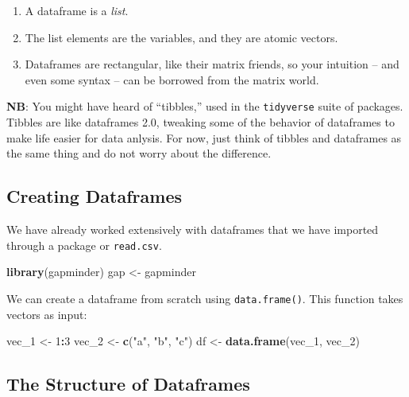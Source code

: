 \documentclass[
]{book}
\newenvironment{Shaded}{\begin{snugshade}}{\end{snugshade}}
\newcommand{\DecValTok}[1]{\textcolor[rgb]{0.00,0.00,0.81}{#1}}
\newcommand{\KeywordTok}[1]{\textcolor[rgb]{0.13,0.29,0.53}{\textbf{#1}}}
\newcommand{\NormalTok}[1]{#1}
\newcommand{\OperatorTok}[1]{\textcolor[rgb]{0.81,0.36,0.00}{\textbf{#1}}}
\newcommand{\StringTok}[1]{\textcolor[rgb]{0.31,0.60,0.02}{#1}}
\providecommand{\tightlist}{%
  \setlength{\itemsep}{0pt}\setlength{\parskip}{0pt}}
\begin{document}
\begin{enumerate}
\def\labelenumi{\arabic{enumi}.}
\tightlist
\item
  A dataframe is a \emph{list}.
\item
  The list elements are the variables, and they are atomic vectors.
\item
  Dataframes are rectangular, like their matrix friends, so your intuition -- and even some syntax -- can be borrowed from the matrix world.
\end{enumerate}

\textbf{NB}: You might have heard of ``tibbles,'' used in the \texttt{tidyverse} suite of packages. Tibbles are like dataframes 2.0, tweaking some of the behavior of dataframes to make life easier for data anlysis. For now, just think of tibbles and dataframes as the same thing and do not worry about the difference.

\hypertarget{creating-dataframes}{%
\subsection{Creating Dataframes}\label{creating-dataframes}}

We have already worked extensively with dataframes that we have imported through a package or \texttt{read.csv}.

\begin{Shaded}
\begin{Highlighting}[]
\KeywordTok{library}\NormalTok{(gapminder)}
\NormalTok{gap <-}\StringTok{ }\NormalTok{gapminder}
\end{Highlighting}
\end{Shaded}

We can create a dataframe from scratch using \texttt{data.frame()}. This function takes vectors as input:

\begin{Shaded}
\begin{Highlighting}[]
\NormalTok{vec_}\DecValTok{1}\NormalTok{ <-}\StringTok{ }\DecValTok{1}\OperatorTok{:}\DecValTok{3}
\NormalTok{vec_}\DecValTok{2}\NormalTok{ <-}\StringTok{ }\KeywordTok{c}\NormalTok{(}\StringTok{"a"}\NormalTok{, }\StringTok{"b"}\NormalTok{, }\StringTok{"c"}\NormalTok{)}
\NormalTok{df <-}\StringTok{ }\KeywordTok{data.frame}\NormalTok{(vec_}\DecValTok{1}\NormalTok{, vec_}\DecValTok{2}\NormalTok{)}
\end{Highlighting}
\end{Shaded}

\hypertarget{the-structure-of-dataframes}{%
\subsection{The Structure of Dataframes}\label{the-structure-of-dataframes}}
\end{document}

